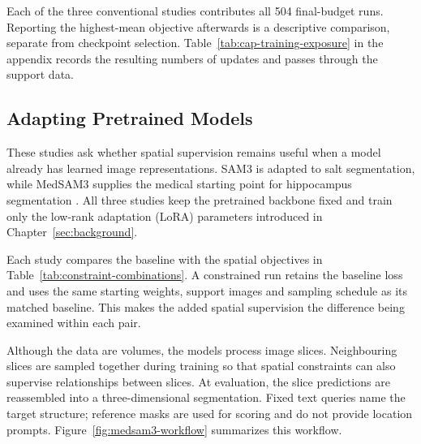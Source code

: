 \documentclass[12pt,a4paper]{article}
\begin{document}
Each of the three conventional studies contributes all 504
final-budget runs. Reporting the highest-mean objective afterwards
is a descriptive comparison, separate from checkpoint selection.
Table~\ref{tab:cap-training-exposure} in the appendix records the resulting
numbers of updates and passes through the support data.

\subsection{Adapting Pretrained Models}

These studies ask whether spatial supervision remains useful when a
model already has learned image representations. SAM3 is adapted to
salt segmentation, while MedSAM3 supplies the medical starting point
for hippocampus segmentation \cite{carion2025sam3,liu2025medsam3}.
All three studies keep the pretrained backbone fixed and train only
the low-rank adaptation (LoRA) parameters introduced in
Chapter~\ref{sec:background}.

Each study compares the baseline with the spatial objectives in
Table~\ref{tab:constraint-combinations}. A constrained run retains
the baseline loss and uses the same starting weights, support images
and sampling schedule as its matched baseline. This makes the added
spatial supervision the difference being examined within each pair.

Although the data are volumes, the models process image slices.
Neighbouring slices are sampled together during training so that
spatial constraints can also supervise relationships between slices.
At evaluation, the slice predictions are reassembled into a
three-dimensional segmentation. Fixed text queries name the target
structure; reference masks are used for scoring and do not provide
location prompts. Figure~\ref{fig:medsam3-workflow} summarizes this
workflow.
\end{document}
